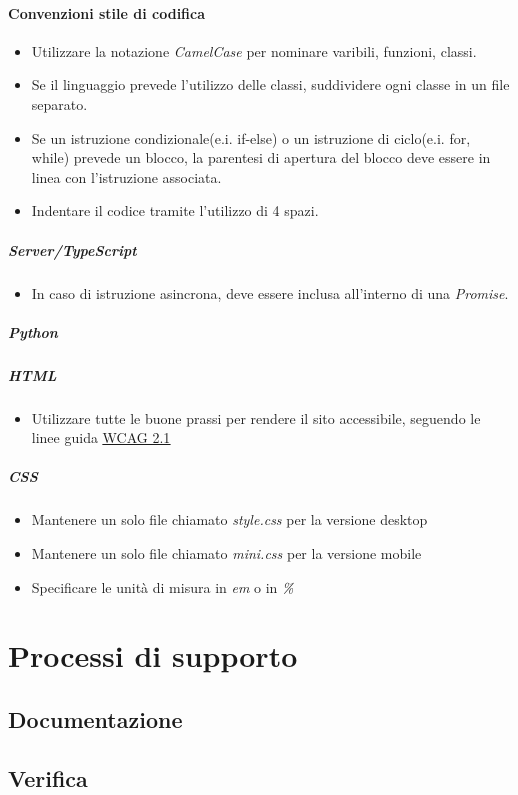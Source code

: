 \documentclass[a4paper, 12pt]{article}
\begin{document}
\paragraph{Convenzioni stile di codifica}
\begin{itemize}
	\item Utilizzare la notazione \textit{CamelCase} per nominare varibili, funzioni, classi.
	\item Se il linguaggio prevede l'utilizzo delle classi, suddividere ogni classe in un file separato.
	\item Se un istruzione condizionale(e.i. if-else) o un istruzione di ciclo(e.i. for, while) prevede un blocco,
	la parentesi di apertura del blocco deve essere in linea con l'istruzione associata.
	\item Indentare il codice tramite l'utilizzo di 4 spazi.
\end{itemize}
\subparagraph{Server/TypeScript}
\begin{itemize}
	\item In caso di istruzione asincrona, deve essere inclusa all'interno di una \textit{Promise}.
\end{itemize}
\subparagraph{Python}
\subparagraph{HTML}
\begin{itemize}
	\item Utilizzare tutte le buone prassi per rendere il sito accessibile, seguendo le linee guida 
	\href{https://www.w3.org/Translations/WCAG21-it/}{\underline{WCAG 2.1}}
\end{itemize}
\subparagraph{CSS}
	\begin{itemize}
		\item Mantenere un solo file chiamato \textit{style.css} per la versione desktop 
		\item Mantenere un solo file chiamato \textit{mini.css} per la versione mobile
		\item Specificare le unità di misura in \textit{em} o in \textit{\%}
	\end{itemize}




\section{Processi di supporto}
\subsection{Documentazione}
\subsection{Verifica}
\end{document}
